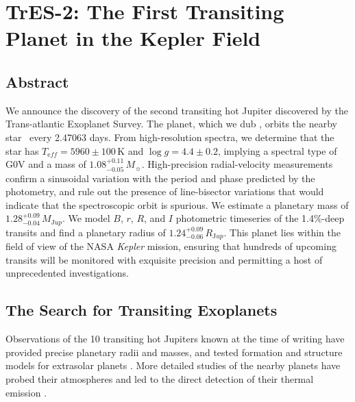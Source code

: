 \chapter[TrES-2: The First Transiting Planet in the Kepler Field]%
{%
TrES-2: The First Transiting Planet in the Kepler Field%
\protect\CFNC%
}\label{cha:tres2}

\section*{Abstract}\label{cha:tres2:sec:abs}

We announce the discovery of the second transiting hot Jupiter
discovered by the Trans-atlantic Exoplanet Survey. The planet, which
we dub \tresTwo, orbits the nearby star \gscOTF\ every 2.47063 days.  From
high-resolution spectra, we determine that the star has $T_{\mathrm
  eff}=5960\pm100\,\mathrm{K}$ and $\log{g}=4.4\pm0.2$, implying a
spectral type of G0V and a mass of $1.08^{+0.11}_{-0.05}\,M_{\sun}$.
High-precision radial-velocity measurements confirm a sinusoidal
variation with the period and phase predicted by the photometry, and
rule out the presence of line-bisector variations that
would indicate that the spectroscopic orbit is spurious.  We estimate
a planetary mass of $1.28^{+0.09}_{-0.04}\,M_{\mathrm Jup}$.  We model
$B$, $r$, $R$, and $I$ photometric timeseries of the 1.4\%-deep
transits and find a planetary radius of $1.24^{+0.09}_{-0.06}\,R_{\mathrm
  Jup}$.  This planet lies within the field of view of the NASA
\textit{Kepler} mission, ensuring that hundreds of upcoming transits
will be monitored with exquisite precision and permitting a host of
unprecedented investigations.

\section{The Search for Transiting Exoplanets}\label{cha:tres2:sec:intro}

Observations of the 10 transiting hot Jupiters known at the time of writing have provided
precise planetary radii and masses, and tested formation and structure
models for extrasolar planets
\citep[see][]{Laughlin_Wolf_Vanmunster:apj:2005a,
  Charbonneau_Brown_Burrows:PPV:2007a}. More detailed studies of the
nearby planets have probed their atmospheres and led to the direct
detection of their thermal emission
\citep[e.g.,][]{Charbonneau_Brown_Noyes:apj:2002a,
  Charbonneau_Allen_Megeath:apj:2005a,
  Deming_Brown_Charbonneau:apj:2005a,
  Deming_Seager_Richardson:nat:2005a}.

